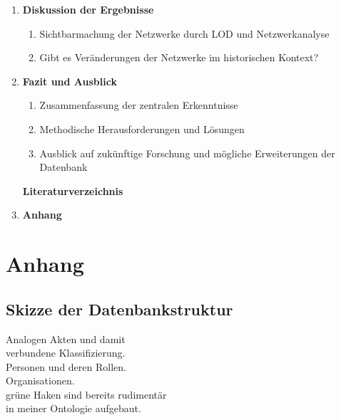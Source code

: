 \documentclass[12pt, a4paper, ngerman, bidi=default]{article}
\begin{document}
\begin{spacing}{1.5}
\begin{enumerate}
    \item \textbf{ Diskussion der Ergebnisse}
    \begin{enumerate}
        \item Sichtbarmachung der Netzwerke durch LOD und Netzwerkanalyse
        \item Gibt es Veränderungen der Netzwerke im historischen Kontext?
    \end{enumerate}
    
    \item \textbf{Fazit und Ausblick}
    \begin{enumerate}
        \item Zusammenfassung der zentralen Erkenntnisse
        \item Methodische Herausforderungen und Lösungen
        \item Ausblick auf zukünftige Forschung und mögliche Erweiterungen der Datenbank
    \end{enumerate}

    \textbf{Literaturverzeichnis}
    
    \item \textbf{Anhang}
    
\end{enumerate}

\newpage
\section{\textbf{Anhang}}
\subsection{Skizze der Datenbankstruktur}
\begin{tcolorbox}[colback=gray!20, colframe=gray!50, width=\dimexpr\textwidth-7cm\relax]
\textcolor{blue}{} Analogen Akten und damit \\
\hspace*{0.5cm}verbundene Klassifizierung.\\
\textcolor{yellow}{} Personen und deren Rollen.\\
\textcolor{orange}{} Organisationen.\\
\textcolor{green}{} grüne Haken sind bereits rudimentär \\\hspace*{0.5cm}in meiner Ontologie aufgebaut.
\end{tcolorbox}\label{sec:AnhangDatenbankstruktur}
\vspace{1em}


\end{spacing}
\end{document}
